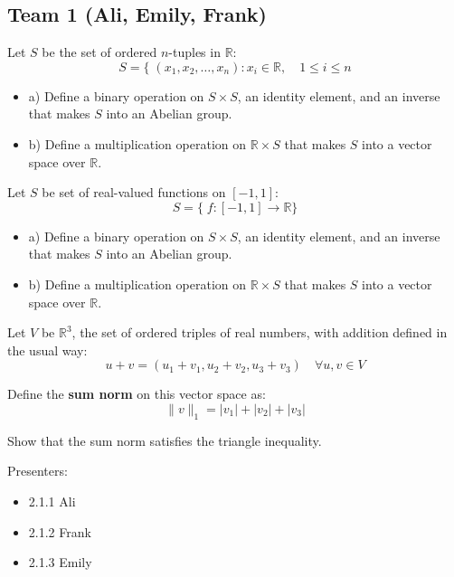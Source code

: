 \subsection*{Team 1 (Ali, Emily, Frank)} 
\par\vspace{0.3 cm}
\begin{problem*}
Let $S$ be the set of ordered $n$-tuples in $\mathbb{R}$:  
\[
S=\{\;(x_1,x_2,\ldots,x_n): x_i\in\mathbb{R},\quad 1\leq i\leq n
\]  
\par\vspace{0.3 cm}
\begin{itemize} 
\item a) Define a binary operation on $S\times S$, an identity element, and an inverse that makes $S$ into an Abelian group.
\item b) Define a multiplication operation on $\mathbb{R}\times S$ that makes $S$ into a vector space over $\mathbb{R}$.
\end{itemize}
\end{problem*}
\par\vspace{0.3 cm}
\begin{problem*}
Let $S$ be set of real-valued functions on $[-1,1]$:  
\[
S=\{\;f:[-1,1]\rightarrow\mathbb{R}\}
\]  
\par\vspace{0.3 cm} 
\begin{itemize}
\item a) Define a binary operation on $S\times S$, an identity element, and an inverse that makes $S$ into an Abelian group.
\item b) Define a multiplication operation on $\mathbb{R}\times S$ that makes $S$ into a vector space over $\mathbb{R}$.
\end{itemize}

\end{problem*}
\par\vspace{0.3 cm}
\begin{problem*}
Let $V$ be $\mathbb{R}^3$, the set of ordered triples of real numbers, with addition defined in the usual way:   
\[
u+v = (u_1+v_1, u_2+v_2, u_3+v_3)\quad \forall u,v\in V
\]  
\par\vspace{0.3 cm} 
Define the \textbf{sum norm} on this vector space as:
\[
\|v\|_1 = |v_1|+|v_2|+|v_3|
\]
\par\vspace{0.3 cm}
Show that the sum norm satisfies the triangle inequality.
\end{problem*}
\par\vspace{0.3 cm}
Presenters:
\begin{itemize}
\item 2.1.1  Ali
\item 2.1.2  Frank
\item 2.1.3  Emily
\end{itemize}

